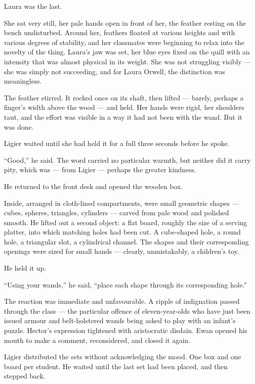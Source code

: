 Laura was the last.
 
She sat very still, her pale hands open in front of her, the feather resting on the bench undisturbed. Around her, feathers floated at various heights and with various degrees of stability, and her classmates were beginning to relax into the novelty of the thing. Laura's jaw was set, her blue eyes fixed on the quill with an intensity that was almost physical in its weight. She was not struggling visibly --- she was simply not succeeding, and for Laura Orwell, the distinction was meaningless.
 
The feather stirred. It rocked once on its shaft, then lifted --- barely, perhaps a finger's width above the wood --- and held. Her hands were rigid, her shoulders taut, and the effort was visible in a way it had not been with the wand. But it was done.
 
Ligier waited until she had held it for a full three seconds before he spoke.
 
\enquote{Good,} he said. The word carried no particular warmth, but neither did it carry pity, which was --- from Ligier --- perhaps the greater kindness.
 
He returned to the front desk and opened the wooden box.
 
Inside, arranged in cloth-lined compartments, were small geometric shapes --- cubes, spheres, triangles, cylinders --- carved from pale wood and polished smooth. He lifted out a second object: a flat board, roughly the size of a serving platter, into which matching holes had been cut. A cube-shaped hole, a round hole, a triangular slot, a cylindrical channel. The shapes and their corresponding openings were sized for small hands --- clearly, unmistakably, a children's toy.
 
He held it up.
 
\enquote{Using your wands,} he said, \enquote{place each shape through its corresponding hole.}
 
The reaction was immediate and unfavourable. A ripple of indignation passed through the class --- the particular offence of eleven-year-olds who have just been issued armour and belt-holstered wands being asked to play with an infant's puzzle. Hector's expression tightened with aristocratic disdain. Ewan opened his mouth to make a comment, reconsidered, and closed it again.
 
Ligier distributed the sets without acknowledging the mood. One box and one board per student. He waited until the last set had been placed, and then stepped back.
 
